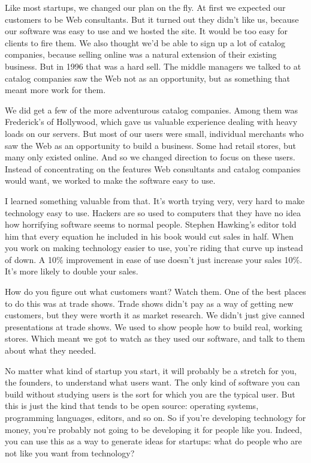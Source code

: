 \documentclass[12pt]{book}
\begin{document}
Like most startups, we changed our plan on the fly. At first we expected
our customers to be Web consultants. But it turned out they didn't like
us, because our software was easy to use and we hosted the site. It
would be too easy for clients to fire them. We also thought we'd be able
to sign up a lot of catalog companies, because selling online was a
natural extension of their existing business. But in 1996 that was a
hard sell. The middle managers we talked to at catalog companies saw the
Web not as an opportunity, but as something that meant more work for
them.

We did get a few of the more adventurous catalog companies. Among them
was Frederick's of Hollywood, which gave us valuable experience dealing
with heavy loads on our servers. But most of our users were small,
individual merchants who saw the Web as an opportunity to build a
business. Some had retail stores, but many only existed online. And so
we changed direction to focus on these users. Instead of concentrating
on the features Web consultants and catalog companies would want, we
worked to make the software easy to use.

I learned something valuable from that. It's worth trying very, very
hard to make technology easy to use. Hackers are so used to computers
that they have no idea how horrifying software seems to normal people.
Stephen Hawking's editor told him that every equation he included in his
book would cut sales in half. When you work on making technology easier
to use, you're riding that curve up instead of down. A 10\% improvement
in ease of use doesn't just increase your sales 10\%. It's more likely
to double your sales.

How do you figure out what customers want? Watch them. One of the best
places to do this was at trade shows. Trade shows didn't pay as a way of
getting new customers, but they were worth it as market research. We
didn't just give canned presentations at trade shows. We used to show
people how to build real, working stores. Which meant we got to watch as
they used our software, and talk to them about what they needed.

No matter what kind of startup you start, it will probably be a stretch
for you, the founders, to understand what users want. The only kind of
software you can build without studying users is the sort for which you
are the typical user. But this is just the kind that tends to be open
source: operating systems, programming languages, editors, and so on. So
if you're developing technology for money, you're probably not going to
be developing it for people like you. Indeed, you can use this as a way
to generate ideas for startups: what do people who are not like you want
from technology?
\end{document}
